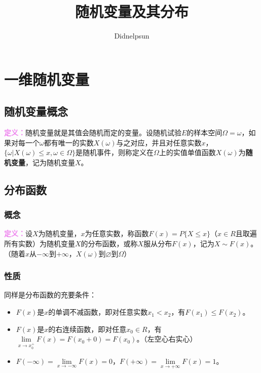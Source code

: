 \documentclass[UTF8, 12pt]{ctexart}
\author{Didnelpsun}
\title{随机变量及其分布}
\date{}
\begin{document}
\maketitle
\pagestyle{empty}
\thispagestyle{empty}
\tableofcontents
\thispagestyle{empty}
\newpage
\pagestyle{plain}
\setcounter{page}{1}
\section{一维随机变量}

\subsection{随机变量概念}

\textcolor{violet}{\textbf{定义：}}随机变量就是其值会随机而定的变量。设随机试验$E$的样本空间$\Omega={\omega}$，如果对每一个$\omega$都有唯一的实数$X(\omega)$与之对应，并且对任意实数$x$，$\{\omega|X(\omega)\leqslant x,\omega\in\Omega\}$是随机事件，则称定义在$\Omega$上的实值单值函数$X(\omega)$为\textbf{随机变量}，记为随机变量$X$。

\subsection{分布函数}

\subsubsection{概念}

\textcolor{violet}{\textbf{定义：}}设$X$为随机变量，$x$为任意实数，称函数$F(x)=P\{X\leqslant x\}$（$x\in R$且取遍所有实数）为随机变量$X$的分布函数，或称$X$服从分布$F(x)$，记为$X\sim F(x)$。（随着$x$从$-\infty$到$+\infty$，$X(\omega)$到$\varnothing$到$\Omega$）

\subsubsection{性质}

同样是分布函数的充要条件：

\begin{itemize}
    \item $F(x)$是$x$的单调不减函数，即对任意实数$x_1<x_2$，有$F(x_1)\leqslant F(x_2)$。
    \item $F(x)$是$x$的右连续函数，即对任意$x_0\in R$，有$\lim\limits_{x\to x_0^+}F(x)=F(x_0+0)=F(x_0)$。（左空心右实心）
    \item $F(-\infty)=\lim\limits_{x\to-\infty}F(x)=0$，$F(+\infty)=\lim\limits_{x\to+\infty}F(x)=1$。
\end{itemize}
\end{document}
